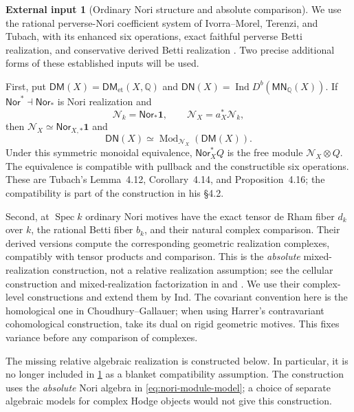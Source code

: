 \documentclass[11pt]{article}
\numberwithin{equation}{section}
\theoremstyle{definition}
\newtheorem{externalinput}[externalinput]{External input}
\theoremstyle{remark}
\newcommand{\Q}{\mathbb Q}
\newcommand{\MN}{\mathsf{MN}}
\newcommand{\Spec}{\operatorname{Spec}}
\newcommand{\one}{\mathbf1}
\begin{document}
\begin{externalinput}[Ordinary Nori structure and absolute comparison]
\label{input:ordinary}
We use the rational perverse-Nori coefficient system of
Ivorra--Morel, Terenzi, and Tubach, with its enhanced six operations,
exact faithful perverse Betti realization, and conservative derived Betti
realization \cite{IvorraMorel,Terenzi,Tubach}. Two precise additional
forms of these established inputs will be used.

First, put $\mathsf{DM}(X)=\mathsf{DM}_{\mathrm{et}}(X,\Q)$ and
$\mathsf{DN}(X)=\operatorname{Ind}D^b(\MN_{\Q}(X))$. If
$\mathsf{Nor}^*\dashv\mathsf{Nor}_*$ is Nori realization and
\[
 \mathscr N_k=\mathsf{Nor}_*\one,\qquad
 \mathscr N_X=a_X^*\mathscr N_k,
\]
then $\mathscr N_X\simeq\mathsf{Nor}_{X,*}\one$ and
\begin{equation}\label{eq:nori-module-model}
 \mathsf{DN}(X)\simeq
 \operatorname{Mod}_{\mathscr N_X}(\mathsf{DM}(X)).
\end{equation}
Under this symmetric monoidal equivalence, $\mathsf{Nor}_X^*Q$ is the
free module $\mathscr N_X\otimes Q$. The equivalence is compatible
with pullback and the constructible six operations. These are
Tubach's Lemma~4.12, Corollary~4.14, and Proposition~4.16; the compatibility
is part of the construction in his \S4.2.

Second, at $\Spec k$ ordinary Nori motives have the exact tensor de Rham
fiber $d_k$ over $k$, the rational Betti fiber $b_k$, and their natural
complex comparison. Their derived versions compute the corresponding
geometric realization complexes, compatibly with tensor products and
comparison. This is the \emph{absolute} mixed-realization construction,
not a relative realization assumption; see the cellular construction and
mixed-realization factorization in
\cite[Theorems~7.4.17 and~7.6.5]{Harrer} and
\cite[\S\S6--7, especially Propositions~7.1 and~7.12]{ChoudhuryGallauer}.
We use their complex-level constructions and extend them by Ind.
The covariant convention here is the homological one in
Choudhury--Gallauer; when using Harrer's contravariant cohomological
construction, take its dual on rigid geometric motives. This fixes
variance before any comparison of complexes.
\end{externalinput}

The missing relative algebraic realization is constructed below. In
particular, it is no longer included in \cref{input:ordinary} as a blanket
compatibility assumption. The construction uses the \emph{absolute}
Nori algebra in \eqref{eq:nori-module-model}; a choice of separate
algebraic models for complex Hodge objects would not give this construction.
\end{document}
